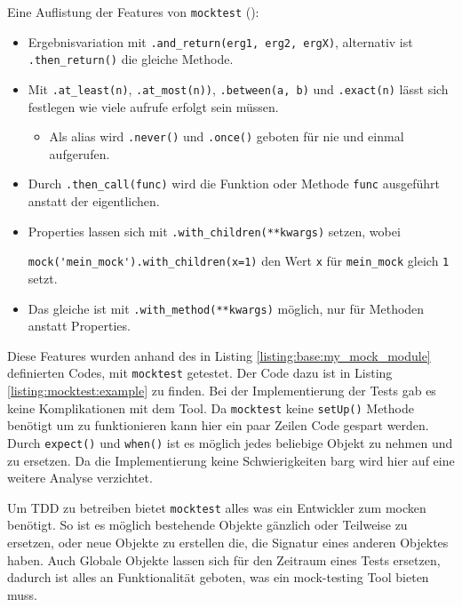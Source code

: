 \noindent
Eine Auflistung der Features von \lstinline{mocktest} (\cite{mocktest:doc}):
\begin{itemize}
    \item Ergebnisvariation mit \lstinline{.and_return(erg1, erg2, ergX)},
    alternativ ist \lstinline{.then_return()} die gleiche Methode.
    
    \item Mit \lstinline{.at_least(n)}, \lstinline{.at_most(n))},
    \lstinline{.between(a, b)} und \lstinline{.exact(n)} lässt sich festlegen
    wie viele aufrufe erfolgt sein müssen.
    
    \begin{itemize}
        \item Als alias wird \lstinline{.never()} und \lstinline{.once()} geboten für nie und einmal aufgerufen.
    \end{itemize}

    \item Durch \lstinline{.then_call(func)} wird die Funktion oder Methode
    \lstinline{func} ausgeführt anstatt der eigentlichen.
    
    \item Properties lassen sich mit \lstinline{.with_children(**kwargs)}
    setzen, wobei
    
    \lstinline{mock('mein_mock').with_children(x=1)} den Wert \lstinline{x}  für
    \lstinline{mein_mock} gleich \lstinline{1} setzt.
    
    \item Das gleiche ist mit \lstinline{.with_method(**kwargs)} möglich, nur für Methoden anstatt Properties.
\end{itemize}

\noindent
Diese Features wurden anhand des in Listing \ref{listing:base:my_mock_module}
definierten Codes, mit \lstinline{mocktest} getestet. Der Code dazu ist in
Listing \ref{listing:mocktest:example} zu finden. Bei der Implementierung der
Tests gab es keine Komplikationen mit dem Tool. Da \lstinline{mocktest} keine
\lstinline{setUp()} Methode benötigt um zu funktionieren kann hier ein paar
Zeilen Code gespart werden. Durch \lstinline{expect()} und \lstinline{when()}
ist es möglich jedes beliebige Objekt zu nehmen und zu ersetzen. Da die
Implementierung keine Schwierigkeiten barg wird hier auf eine weitere Analyse
verzichtet.
\newline

Um TDD zu betreiben bietet \lstinline{mocktest} alles was ein Entwickler zum
\gls{mock}en benötigt. So ist es möglich bestehende Objekte gänzlich oder
Teilweise zu ersetzen, oder neue Objekte zu erstellen die, die Signatur eines
anderen Objektes haben. Auch Globale Objekte lassen sich für den Zeitraum eines
Tests ersetzen, dadurch ist alles an Funktionalität geboten, was ein
\gls{mock}-testing Tool bieten muss.

